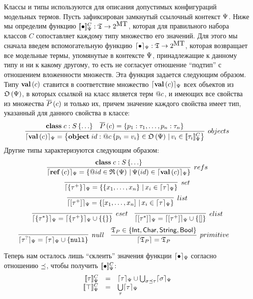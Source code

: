 Классы и типы используются для описания допустимых конфигураций модельных термов. 
Пусть зафиксирован замкнутый ссылочный контекст $\Psi$. 
Ниже мы определим функцию $[\![\bullet]\!]_\Psi^C : \mathfrak{T} \rightarrow 2^{\mbox{MT}}$, которая для правильного набора классов $C$ сопоставляет каждому типу множество его значений. Для этого мы сначала введем вспомогательную функцию $\lceil \bullet \rceil_\Psi : \mathfrak{T} \rightarrow 2^{\mbox{MT}}$, которая возвращает все модельные термы, упомянутые в контексте $\Psi$, принадлежащие к данному типу и ни к какому другому, то есть не согласует отношение ``подтип'' с отношением вложенности множеств. Эта функция задается следующим образом. Типу $\mathbf{val}\left(c\right)$ ставится в соответствие множество $\lceil \mathbf{val}\left(c\right) \rceil_\Psi$ всех объектов из $\mathfrak{O}\left(\Psi\right)$, в которых ссылкой на класс является терм $@c$, и имеющих все свойства из множества $\overline{P}\left(c\right)$ и только их, причем значение каждого свойства имеет тип, указанный для данного свойства в классе:
$$
\infer[objects]{
	\semRC{\ClassT{c}} = \left\{
		\Object{id}{\Ref{c}}{p_i = v_i} \in \Objects{\RContext}
		\,|\,
		v_i \in \denotRCC{\tau_i} 
	\right\}
}{
	\Class{c}{S}{\ldots}&
	\AllProps{c} = \left\{p_1 : \tau_1, \ldots, p_n : \tau_n\right\}
}
$$ 
Другие типы характеризуются следующим образом:
$$
\infer[refs]{
	\semRC{\RefT{c}} = \left\{ \Ref{id} \in \Refs{\RContext} \,|\, \RContext(id) \in \semRC{\ClassT{c}} \right\}
}{
	\Class{c}{S}{\ldots}
}
$$ $$
\infer[set]{
	\semRC{\SetT{\tau^+}} = \left\{ \Set{x_1,\ldots,x_n} \,|\, x_i \in \semRC{\tau}\right\}
}{
}
$$ $$
\infer[list]{
	\semRC{\ListT{\tau^+}} = \left\{ \List{x_1,\ldots,x_n} \,|\, x_i \in \semRC{\tau}\right\}
}{
}
$$ $$
\infer[eset]{
	\semRC{\SetT{\tau^*}} = \semRC{\SetT{\tau^+}} \cup \left\{ \Set{} \right\}
}{}	
\quad
\infer[elist]{
	\semRC{\ListT{\tau^*}} = \semRC{\ListT{\tau^+}} \cup \left\{ \List{} \right\}
}{}	
$$ $$
\infer[null]{
	\semRC{\NullableT{\tau}} = \semRC{\tau} \cup \{\Null\}
}{
}
\quad
\infer[primitive]{
	\sem{\Types_P} = \Types_P
}{
	\Types_P \in \{\IntegerT, \CharT, \StringT, \BooleanT\}
}
\quad
$$

Теперь нам осталось лишь ``склеить'' значения функции $\lceil \bullet \rceil_\Psi$ согласно отношению $\preceq$, чтобы получить $[\![\bullet]\!]_\Psi^C$:
$$
\begin{array}{rcl}
	\denotRCC{\tau} &=& \semRC{\tau} \cup \bigcup_{\sigma \subtype \tau} \semRC{\sigma}\\
	\denotRCC{\top} &=& \bigcup\limits_\tau \semRC{\tau}\\
\end{array}	
$$

